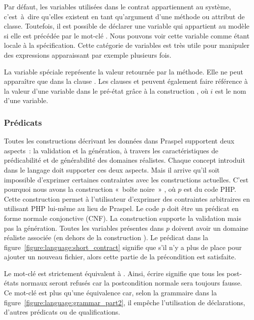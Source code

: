 Par défaut, les variables utilisées dans le contrat appartiennent au système,
c'est~à~dire qu'elles existent en tant qu'argument d'une méthode ou attribut de
classe. Toutefois, il est possible de déclarer une variable qui appartient au
modèle si elle est précédée par le mot-clé . Nous pouvons voir cette
variable comme étant locale à la spécification. Cette catégorie de variables est
très utile pour manipuler des expressions apparaissant par exemple plusieurs
fois.

La variable spéciale \aresult représente la valeur {\strong retournée} par la
méthode. Elle ne peut apparaître que dans la clause \aensures. Les clauses
\aensures et \athrowable peuvent également faire référence à la valeur d'une
variable dans le pré-état grâce à la construction , où $i$ est le nom
d'une variable.

\subsubsection{Prédicats}

Toutes les constructions décrivant les données dans Praspel supportent deux
aspects~: la validation et la génération, à travers les caractéristiques de
prédicabilité et de générabilité des domaines réalistes. Chaque concept
introduit dans le langage doit supporter ces deux aspects. Mais il arrive qu'il
soit impossible d'exprimer certaines contraintes avec les constructions
actuelles. C'est pourquoi nous avons la construction «~boîte noire~» ,
où $p$ est du code PHP. Cette construction permet à l'utilisateur d'exprimer des
contraintes arbitraires en utilisant PHP lui-même au lieu de Praspel. Le code
$p$ doit être un prédicat en forme normale {\strong conjonctive} (CNF). La
construction  supporte la validation mais pas la génération. Toutes les
variables présentes dans $p$ doivent avoir un domaine réaliste associée (en
dehors de la construction ). Le prédicat
 dans la figure~\ref{figure:language:short_contract} signifie
que s'il n'y a plus de place pour ajouter un nouveau fichier, alors cette partie
de la précondition est satisfaite.

Le mot-clé \anone est strictement équivalent à . Ainsi,
écrire \code{\aensures \anone;} signifie que tous les post-états normaux seront
refusés car la postcondition normale sera toujours fausse. Ce mot-clé est plus
qu'une équivalence car, selon la grammaire dans la
figure~\ref{figure:language:grammar_part2}, il empêche l'utilisation de
déclarations, d'autres prédicats ou de qualifications.

